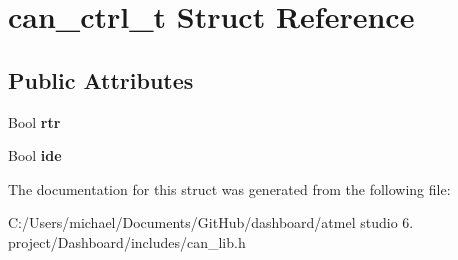 \hypertarget{structcan__ctrl__t}{\section{can\-\_\-ctrl\-\_\-t Struct Reference}
\label{structcan__ctrl__t}
}
\subsection*{Public Attributes}
\begin{DoxyCompactItemize}
\item 
\hypertarget{structcan__ctrl__t_adda290d61bd461ab03c0e4eaa6f3d2ce}{Bool {\bfseries rtr}}\label{structcan__ctrl__t_adda290d61bd461ab03c0e4eaa6f3d2ce}

\item 
\hypertarget{structcan__ctrl__t_acecd342836eb64d625978eb4f0e769ca}{Bool {\bfseries ide}}\label{structcan__ctrl__t_acecd342836eb64d625978eb4f0e769ca}

\end{DoxyCompactItemize}


The documentation for this struct was generated from the following file\-:\begin{DoxyCompactItemize}
\item 
C\-:/\-Users/michael/\-Documents/\-Git\-Hub/dashboard/atmel studio 6. project/\-Dashboard/includes/can\-\_\-lib.\-h\end{DoxyCompactItemize}
